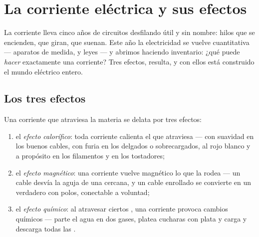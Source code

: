 \chapter{La corriente eléctrica y sus efectos}\label{ch:g8:electric-current-effects}

La corriente lleva cinco años de circuitos desfilando útil y sin
nombre: hilos que se encienden,  que giran,
 que suenan. Este año la electricidad se vuelve
cuantitativa --- aparatos de medida,  y leyes --- y abrimos
haciendo inventario: ¿qué puede \emph{hacer} exactamente una corriente?
Tres efectos, resulta, y con ellos está construido el mundo eléctrico
entero.

\section{Los tres efectos}

\begin{proposition}\label{prop:g8:electric-current-effects:three}
Una corriente que atraviesa la materia se delata por tres efectos:
\begin{enumerate}
  \item el \emph{efecto calorífico}: toda
        corriente calienta el  que atraviesa --- con
        suavidad en los buenos cables, con furia en los delgados o
        sobrecargados, al rojo blanco y a propósito en los
        filamentos y en los tostadores;
  \item el \emph{efecto magnético}: una
        corriente vuelve magnético lo que la rodea --- un cable
        desvía la aguja de una  cercana, y un cable
        enrollado se convierte en un verdadero  con polos,
        conectable a voluntad;
  \item el \emph{efecto químico}: al
        atravesar ciertos , una corriente provoca cambios
        químicos --- parte el agua en dos gases, platea cucharas con
        plata y carga y descarga todas las .
\end{enumerate}
\end{proposition}

